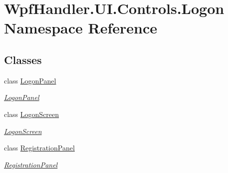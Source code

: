 \hypertarget{namespace_wpf_handler_1_1_u_i_1_1_controls_1_1_logon}{}\section{Wpf\+Handler.\+U\+I.\+Controls.\+Logon Namespace Reference}
\label{namespace_wpf_handler_1_1_u_i_1_1_controls_1_1_logon}
\subsection*{Classes}
\begin{DoxyCompactItemize}
\item 
class \mbox{\hyperlink{class_wpf_handler_1_1_u_i_1_1_controls_1_1_logon_1_1_logon_panel}{Logon\+Panel}}
\begin{DoxyCompactList}\small\item\em \mbox{\hyperlink{class_wpf_handler_1_1_u_i_1_1_controls_1_1_logon_1_1_logon_panel}{Logon\+Panel}} \end{DoxyCompactList}\item 
class \mbox{\hyperlink{class_wpf_handler_1_1_u_i_1_1_controls_1_1_logon_1_1_logon_screen}{Logon\+Screen}}
\begin{DoxyCompactList}\small\item\em \mbox{\hyperlink{class_wpf_handler_1_1_u_i_1_1_controls_1_1_logon_1_1_logon_screen}{Logon\+Screen}} \end{DoxyCompactList}\item 
class \mbox{\hyperlink{class_wpf_handler_1_1_u_i_1_1_controls_1_1_logon_1_1_registration_panel}{Registration\+Panel}}
\begin{DoxyCompactList}\small\item\em \mbox{\hyperlink{class_wpf_handler_1_1_u_i_1_1_controls_1_1_logon_1_1_registration_panel}{Registration\+Panel}} \end{DoxyCompactList}\end{DoxyCompactItemize}
